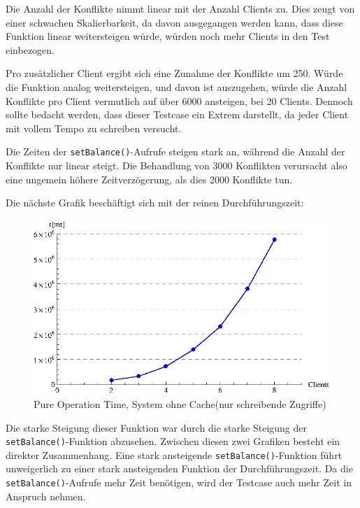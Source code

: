 Die Anzahl der Konflikte nimmt linear mit der Anzahl Clients zu. Dies zeugt von einer schwachen Skalierbarkeit, da davon ausgegangen werden kann, dass diese Funktion linear weitersteigen würde, würden noch mehr Clients in den Test einbezogen.  

Pro zusätzlicher Client ergibt sich eine Zunahme der Konflikte um 250. Würde die Funktion analog weitersteigen, und davon ist auszugehen, würde die Anzahl Konflikte pro Client vermutlich auf über 6000 ansteigen, bei 20 Clients. Dennoch sollte bedacht werden, dass dieser Testcase ein Extrem darstellt, da jeder Client mit vollem Tempo zu schreiben versucht. 

Die Zeiten der \texttt{setBalance()}-Aufrufe steigen stark an, während die Anzahl der Konflikte nur linear steigt. Die Behandlung von 3000 Konflikten verursacht also eine ungemein höhere Zeitverzögerung, als dies 2000 Konflikte tun. 

Die nächste Grafik beschäftigt sich mit der reinen Durchführungszeit:
\begin{figure}[H]
\begin{center}
\includegraphics[width=\textwidth]{images_MessErgebnisse/incrementCachePureOperationTime.eps}
\end{center}
\caption{Pure Operation Time, System ohne Cache(nur schreibende Zugriffe)}
\end{figure}

Die starke Steigung dieser Funktion war durch die starke Steigung der \texttt{setBalance()}-Funktion abzusehen. Zwischen diesen zwei Grafiken besteht ein direkter Zusammenhang. Eine stark ansteigende \texttt{setBalance()}-Funktion führt unweigerlich zu einer stark ansteigenden Funktion der Durch\-führungs\-zeit. Da die \texttt{setBalance()}-Aufrufe mehr Zeit benötigen, wird der Testcase auch mehr Zeit in Anspruch nehmen.

